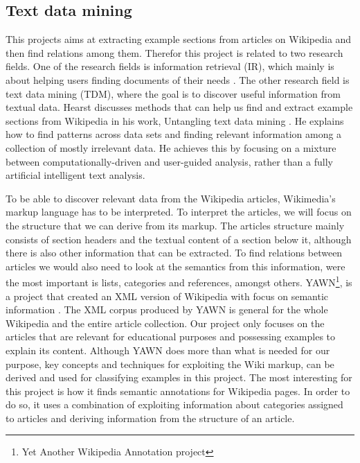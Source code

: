 \subsection{Text data mining} \label{sec_tdm}
This projects aims at extracting example sections from articles on Wikipedia and then find relations among them. Therefor this project is related to two research fields. One of the research fields is information retrieval (IR), which mainly is about helping users finding documents of their needs \cite{irbook}. The other research field is text data mining (TDM), where the goal is to discover useful information from textual data. Hearst discusses methods that can help us find and extract example sections from Wikipedia in his work, Untangling text data mining \cite{untanglingTDM}. He explains how to find patterns across data sets and finding relevant information among a collection of mostly irrelevant data. He achieves this by focusing on a mixture between computationally-driven and user-guided analysis, rather than a fully artificial intelligent text analysis.


To be able to discover relevant data from the Wikipedia articles, Wikimedia's markup language has to be interpreted.  To interpret the articles, we will focus on the structure that we can derive from its markup. The articles structure mainly consists of section headers and the textual content of a section below it, although there is also other information that can be extracted. To find relations between articles we would also need to look at the semantics from this information, were the most important is lists, categories and references, amongst others. YAWN\footnote{Yet Another Wikipedia Annotation project}, is a project that created an XML version of Wikipedia with focus on semantic information \cite{yawn}. The XML corpus produced by YAWN is general for the whole Wikipedia and the entire article collection. Our project only focuses on the articles that are relevant for educational purposes and possessing examples to explain its content. Although YAWN does more than what is needed for our purpose, key concepts and techniques for exploiting the Wiki markup, can be derived and used for classifying examples in this project. The most interesting for this project is how it finds semantic annotations for Wikipedia pages. In order to do so, it uses a combination of exploiting information about categories assigned to articles and deriving information from the structure of an article.

